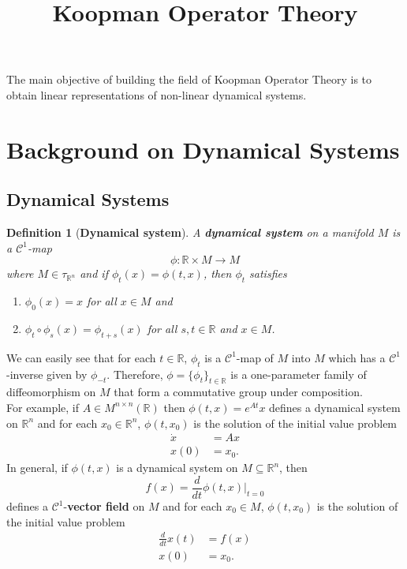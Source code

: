 \documentclass[]{article}
\title{Koopman Operator Theory}
\author{}
\date{}
\newtheorem{definition}{Definition}
\begin{document}
\maketitle

The main objective of building the field of Koopman Operator Theory is to obtain linear representations of non-linear dynamical systems.

\section{Background on Dynamical Systems}
\subsection{Dynamical Systems}
\begin{definition}[\textbf{Dynamical system}]
A \textbf{dynamical system} on a manifold $M$ is a $\mathcal{C}^1$-map 
\begin{equation}
	\phi: \mathbb{R} \times M \to M
\end{equation}
where $M \in \tau_{\mathbb{R}^n}$ and if $\phi_t(x)=\phi(t,x)$, then $\phi_t$ satisfies
\begin{enumerate}
	\item $\phi_0(x)=x$ for all $x \in M$ and 
	\item $\phi_t \circ \phi_s (x) = \phi_{t+s}(x)$ for all $s,t \in \mathbb{R}$ and $x \in M$.
\end{enumerate}
\end{definition}
We can easily see that for each $t \in \mathbb{R}$, $\phi_t$ is a $\mathcal{C}^1$-map of $M$ into $M$ which has a $\mathcal{C}^1$-inverse given by $\phi_{-t}$. Therefore, $\phi = \{\phi_t\}_{t \in \mathbb{R}}$ is a one-parameter family of diffeomorphism on $M$ that form a commutative group under composition. \\
For example, if $A \in M^{n \times n}(\mathbb{R})$ then $\phi(t,x)=e^{At}x$ defines a dynamical system on $\mathbb{R}^n$ and for each $x_0 \in \mathbb{R}^n$, $\phi(t,x_0)$ is the solution of the initial value problem
\begin{equation}
	\begin{split}
		\dot{x} & = Ax \\
		x(0) & = x_0.
	\end{split}
\end{equation}
In general, if $\phi(t,x)$ is a dynamical system on $M \subseteq \mathbb{R}^n$, then
\begin{equation}
	f(x)=\frac{d}{dt}\phi(t,x)\bigg|_{t=0}
\end{equation}
defines a $\mathcal{C}^1$-\textbf{vector field} on $M$ and for each $x_0 \in M$, $\phi(t,x_0)$ is the solution of the initial value problem
\begin{equation}
	\begin{split}
		\frac{d}{dt} x(t) & = f(x) \\
		x(0) & = x_0.
	\end{split}
\end{equation}
\end{document}
